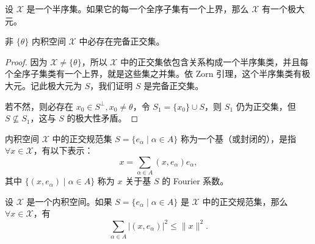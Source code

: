 \documentclass[lang=cn,newtx,10pt,scheme=chinese,thmcnt=chapter]{elegantbook}
\begin{document}
\begin{lemma}[Zorn 引理]
设 $\mathscr{X}$ 是一个半序集。如果它的每一个全序子集有一个上界，那么 $\mathscr{X}$ 有一个极大元。
\end{lemma}

\begin{proposition}
非 $\{\theta\}$ 内积空间 $\mathscr{X}$ 中必存在完备正交集。
\end{proposition}

\begin{proof}
因为 $\mathscr{X} \neq \{\theta\}$，所以 $\mathscr{X}$ 中的正交集依包含关系构成一个半序集类，并且每个全序子集类有一个上界，就是这些集之并集。依 Zorn 引理，这个半序集类有极大元。记此极大元为 $S$，我们证明 $S$ 是完备正交集。

若不然，则必存在 $x_0 \in S^{\perp}, x_0 \neq \theta$，令 $S_1 = \{x_0\} \cup S$，则 $S_1$ 仍为正交集，但 $S \nsubseteq S_1$，这与 $S$ 的极大性矛盾。
\end{proof}

\begin{definition}[正交规范基]
内积空间 $\mathscr{X}$ 中的正交规范集 $S = \{e_\alpha \mid \alpha \in A\}$ 称为一个基（或封闭的），是指 $\forall x \in \mathscr{X}$，有以下表示：
\begin{equation*}
x = \sum_{\alpha \in A} (x, e_\alpha) e_\alpha,
\end{equation*}
其中 $\{(x, e_\alpha) \mid \alpha \in A\}$ 称为 $x$ 关于基 $S$ 的 Fourier 系数。
\end{definition}

\begin{theorem}\label{thm:bessel}
设 $\mathscr{X}$ 是一个内积空间。如果 $S = \{e_\alpha \mid \alpha \in A\}$ 是 $\mathscr{X}$ 中的正交规范集，那么 $\forall x \in \mathscr{X}$，有
\begin{equation*}
\sum_{\alpha \in A}\left|\left(x, e_\alpha\right)\right|^2 \leqslant \|x\|^2. 
\end{equation*}
\end{theorem}
\end{document}
